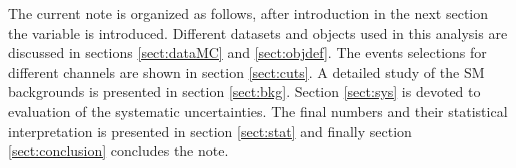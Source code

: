 The current note is organized as follows, after introduction in the next section the \mttwo variable is introduced. Different datasets 
and objects used in this analysis are discussed in sections \ref{sect:dataMC} and \ref{sect:objdef}. The events selections for different channels
are shown in section \ref{sect:cuts}. A detailed study of the SM backgrounds is presented in section \ref{sect:bkg}. Section \ref{sect:sys} 
is devoted to evaluation of the systematic uncertainties. The final numbers and their statistical interpretation is presented in 
section \ref{sect:stat} and finally section \ref{sect:conclusion} concludes the note.





